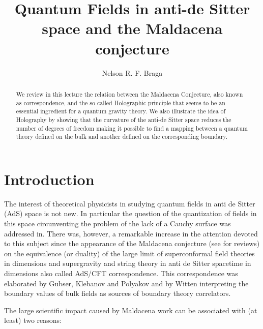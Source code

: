 \documentclass[a4paper,twocolumn,prd,groupedaddress,nofootinbib]{revtex4}
\begin{document}
\title{Quantum Fields in anti-de Sitter space and the Maldacena conjecture}
\author{Nelson R. F. Braga}



\begin{abstract}
We  review  in this lecture the relation between the Maldacena Conjecture,
also  known as \coordHE{} correspondence, and  the so called 
Holographic principle that seems to be an essential ingredient for a 
quantum gravity theory. We  also illustrate the idea of Holography by showing 
that the curvature of the anti-de Sitter space reduces the number of degrees
of freedom making it possible to find a mapping between a quantum theory 
defined on the bulk and another defined on the corresponding boundary.
\end{abstract}


\maketitle

\section{Introduction}
The interest of theoretical physicists in studying quantum fields in
anti de Sitter (AdS) space is not new\cite{Fro}.
In particular the question of the quantization of fields in this space
circunventing the problem of the lack of a Cauchy surface
was addressed in\cite{QAdS1,QAdS2}. 
There was, however, a remarkable increase in the attention devoted
to this subject since the appearance of  the Maldacena 
conjecture\cite{Malda} (see \cite{Malda2,Pe} for reviews)  on the equivalence 
(or duality) of the large \coordHE{} limit of \coordHE{} superconformal 
field theories in \coordHE{} dimensions and supergravity and 
string theory in anti de Sitter spacetime in \coordHE{}  dimensions
also called AdS/CFT correspondence.
This correspondence was elaborated by  Gubser, Klebanov and Polyakov \cite{GKP}
and by Witten \cite{Wi} interpreting the boundary values of bulk fields as
sources of boundary theory correlators.

The large scientific impact caused by Maldacena work can be associated with
(at least) two reasons: 
\end{document}
